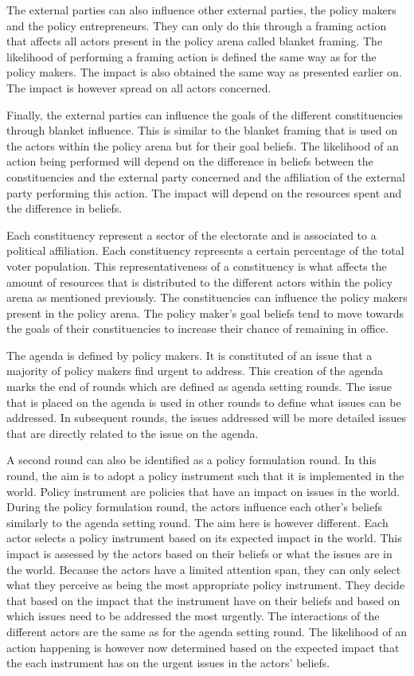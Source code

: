\documentclass{article}
\begin{document}
The external parties can also influence other external parties, the policy makers and the policy entrepreneurs. They can only do this through a framing action that affects all actors present in the policy arena called blanket framing. The likelihood of performing a framing action is defined the same way as for the policy makers. The impact is also obtained the same way as presented earlier on. The impact is however spread on all actors concerned. 

Finally, the external parties can influence the goals of the different constituencies through blanket influence. This is similar to the blanket framing that is used on the actors within the policy arena but for their goal beliefs. The likelihood of an action being performed will depend on the difference in beliefs between the constituencies and the external party concerned and the affiliation of the external party performing this action. The impact will depend on the resources spent and the difference in beliefs.

Each constituency represent a sector of the electorate and is associated to a political affiliation. Each constituency represents a certain percentage of the total voter population. This representativeness of a constituency is what affects the amount of resources that is distributed to the different actors within the policy arena as mentioned previously. The constituencies can influence the policy makers present in the policy arena. The policy maker’s goal beliefs tend to move towards the goals of their constituencies to increase their chance of remaining in office.

The agenda is defined by policy makers. It is constituted of an issue that a majority of policy makers find urgent to address. This creation of the agenda marks the end of rounds which are defined as agenda setting rounds. The issue that is placed on the agenda is used in other rounds to define what issues can be addressed. In subsequent rounds, the issues addressed will be more detailed issues that are directly related to the issue on the agenda.

A second round can also be identified as a policy formulation round. In this round, the aim is to adopt a policy instrument such that it is implemented in the world. Policy instrument are policies that have an impact on issues in the world. During the policy formulation round, the actors influence each other’s beliefs similarly to the agenda setting round. The aim here is however different. Each actor selects a policy instrument based on its expected impact in the world. This impact is assessed by the actors based on their beliefs or what the issues are in the world. Because the actors have a limited attention span, they can only select what they perceive as being the most appropriate policy instrument. They decide that based on the impact that the instrument have on their beliefs and based on which issues need to be addressed the most urgently. The interactions of the different actors are the same as for the agenda setting round. The likelihood of an action happening is however now determined based on the expected impact that the each instrument has on the urgent issues in the actors’ beliefs.
\end{document}

